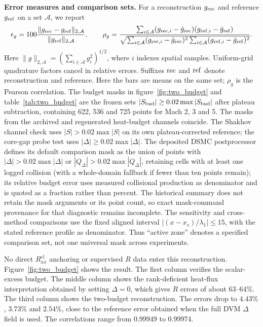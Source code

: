\documentclass[lineno,paper]{JFM-FLM_Au}
\newenvironment{revision}{\nolinenumbers\begin{tcolorbox}[breakable,colback=revisionyellow,colframe=revisionyellow,boxrule=0pt,arc=0pt,left=5pt,right=5pt,top=5pt,bottom=5pt,before skip=6pt,after skip=6pt]\captionsetup{width=\linewidth}}{\end{tcolorbox}\linenumbers}
\newenvironment{revision}{}{}
\newcommand{\cl}{\mathrm{cl}}
\begin{document}
\begin{revision}
\textbf{Error measures and comparison sets.} For a reconstruction $g_{\rm rec}$ and reference $g_{\rm ref}$ on a set $\mathcal A$, we report
\[
 \epsilon_g=100\frac{\|g_{\rm rec}-g_{\rm ref}\|_{2,\mathcal A}}{\|g_{\rm ref}\|_{2,\mathcal A}},\qquad
 \rho_g=\frac{\sum_{i\in\mathcal A}(g_{{\rm rec},i}-\bar g_{\rm rec})(g_{{\rm ref},i}-\bar g_{\rm ref})}{\sqrt{\sum_{i\in\mathcal A}(g_{{\rm rec},i}-\bar g_{\rm rec})^2\sum_{i\in\mathcal A}(g_{{\rm ref},i}-\bar g_{\rm ref})^2}}.
\]
Here $\|g\|_{2,\mathcal A}=(\sum_{i\in\mathcal A}g_i^2)^{1/2}$,
where $i$ indexes spatial samples. Uniform-grid quadrature factors
cancel in relative errors. Suffixes $\rm rec$ and $\rm ref$ denote
reconstruction and reference. Here the bars are means on the same set; $\rho_g$ is the Pearson correlation. The budget masks in figure~\ref{fig:two_budget} and table~\ref{tab:two_budget} are the frozen sets $|S_{\rm bud}|\geq0.02\max|S_{\rm bud}|$ after plateau subtraction, containing 622, 536 and 725 points for Mach 2, 3 and 5. The masks from the archived and regenerated heat-budget channels coincide. The Shakhov channel check uses $|S|>0.02\max|S|$ on its own plateau-corrected reference; the core-gap probe test uses $|\Delta|\geq0.02\max|\Delta|$. The deposited DSMC postprocessor defines its default comparison mask as the union of points with $|\Delta|>0.02\max|\Delta|$ or $|Q_\Delta|>0.02\max|Q_\Delta|$, retaining cells with at least one logged collision (with a whole-domain fallback if fewer than ten points remain); its relative budget error uses measured collisional production as denominator and is quoted as a fraction rather than percent. The historical summary does not retain the mask arguments or its point count, so exact mask-command provenance for that diagnostic remains incomplete. The sensitivity and cross-method comparisons use the fixed aligned interval $|(x-x_s)/\lambda_1|\leq15$, with the stated reference profile as denominator. Thus ``active zone'' denotes a specified comparison set, not one universal mask across experiments.

No direct $R^{\cl}_{xx}$ anchoring or supervised $R$ data enter this reconstruction.  Figure~\ref{fig:two_budget} shows the result.  The first column verifies the scalar-excess budget.  The middle column shows the rank-deficient heat-flux interpretation obtained by setting $\Delta=0$, which gives $R$ errors of about $63$--$64\%$.  The third column shows the two-budget reconstruction.  The errors drop to $4.43\%$, $3.73\%$ and $2.54\%$, close to the reference error obtained when the full DVM $\Delta$ field is used.  The correlations range from 0.99949 to 0.99974.
\end{revision}
\end{document}
